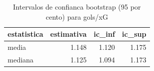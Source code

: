 \begin{table}

\caption{\label{tab:ic_bootstrap_g20}Intervalos de confianca bootstrap (95 por cento) para gols/xG}
\centering
\begin{tabular}[t]{lrrr}
\toprule
estatistica & estimativa & ic\_inf & ic\_sup\\
\midrule
media & 1.148 & 1.120 & 1.175\\
mediana & 1.125 & 1.094 & 1.173\\
\bottomrule
\end{tabular}
\end{table}
